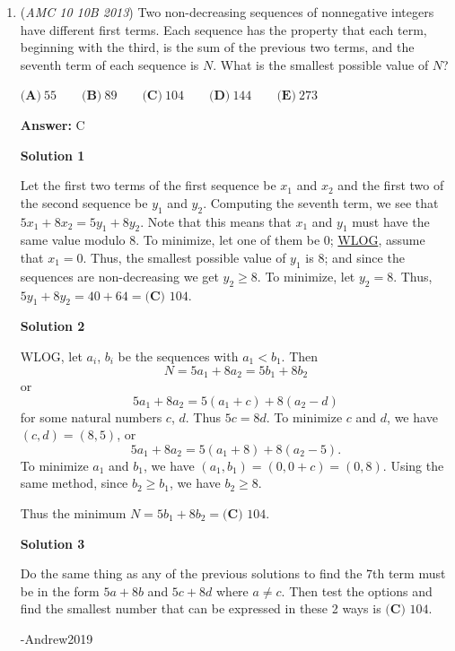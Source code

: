 \begin{enumerate}
 


	\item (\textit{AMC 10 10B 2013}) Two non-decreasing sequences of nonnegative integers have different first terms.  Each sequence has the property that each term, beginning with the third, is the sum of the previous two terms, and the seventh term of each sequence is $N$.  What is the smallest possible value of $N$?


 $\textbf{(A)}\ 55 \qquad\textbf{(B)}\ 89  \qquad\textbf{(C)}\ 104 \qquad\textbf{(D)}\ 144 \qquad\textbf{(E)}\ 273$

 \textbf{Answer: }C



\textbf{Solution 1}

Let the first two terms of the first sequence be $x_{1}$ and $x_{2}$ and the first two of the second sequence be $y_{1}$ and $y_{2}$.  Computing the seventh term, we see that $5x_{1} + 8x_{2} = 5y_{1} + 8y_{2}$.  Note that this means that $x_{1}$ and $y_{1}$ must have the same value modulo $8$.  To minimize, let one of them be $0$; \href{https://artofproblemsolving.com/wiki/index.php?title=WLOG}{WLOG}, assume that $x_{1} = 0$.  Thus, the smallest possible value of $y_{1}$ is $8$; and since the sequences are non-decreasing we get $y_{2} \ge 8$.  To minimize, let $y_{2} = 8$.  Thus, $5y_{1} + 8y_{2} = 40 + 64 = \boxed{\textbf{(C) }104}$.

 



\textbf{Solution 2}

WLOG, let $a_i$, $b_i$ be the sequences with $a_1<b_1$. Then 
 \[N=5a_1+8a_2=5b_1+8b_2\] or 
 \[5a_1+8a_2=5(a_1+c)+8(a_2-d)\] for some natural numbers $c$, $d$. Thus $5c=8d$. To minimize $c$ and $d$, we have $(c,d)=(8,5)$, or 
 \[5a_1+8a_2=5(a_1+8)+8(a_2-5).\] To minimize $a_1$ and $b_1$, we have $(a_1,b_1)=(0,0+c)=(0,8)$. Using the same method, since $b_2\ge b_1$, we have $b_2\ge8$. 

 Thus the minimum $N=5b_1+8b_2= \boxed{\textbf{(C) }104}$.

 



\textbf{Solution 3}

Do the same thing as any of the previous solutions to find the 7th term must be in the form $5a+8b$ and $5c+8d$ where $a\neq c$. Then test the options and find the smallest number that can be expressed in these 2 ways is $\boxed{\textbf{(C) }104}$.

 -Andrew2019


\end{enumerate}
